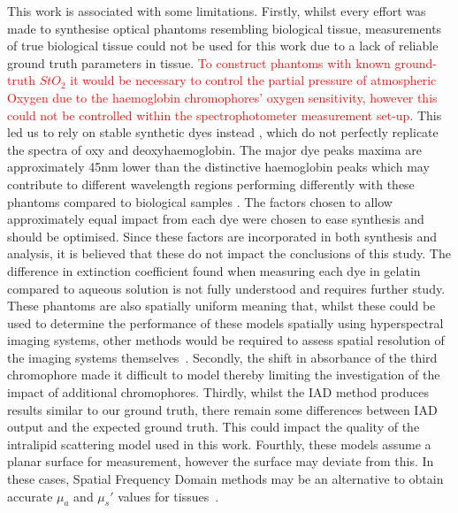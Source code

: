 This work is associated with some limitations.
Firstly, whilst every effort was made to synthesise optical phantoms resembling biological tissue, measurements of true biological tissue could not be used for this work due to a lack of reliable ground truth parameters in tissue. %
\textcolor{red}{To construct phantoms with known ground-truth $StO_2$ it would be necessary to control the partial pressure of atmospheric Oxygen due to the haemoglobin chromophores' oxygen sensitivity, however this could not be controlled within the spectrophotometer measurement set-up.} This led us to rely on stable synthetic dyes instead
, which do not perfectly replicate the spectra of oxy and deoxyhaemoglobin. The major dye peaks maxima are approximately 45nm lower than the distinctive haemoglobin peaks which may contribute to different wavelength regions performing differently with these phantoms compared to biological samples
. 
The factors chosen to allow approximately equal impact from each dye were chosen to ease synthesis and should be optimised. Since these factors are incorporated in both synthesis and analysis, it is believed that these do not impact the conclusions of this study.
The difference in extinction coefficient found when measuring each dye in gelatin compared to aqueous solution is not fully understood and requires further study.
These phantoms are also spatially uniform meaning that, whilst these could be used to determine the performance of these models spatially using hyperspectral imaging systems, other methods would be required to assess spatial resolution of the imaging systems themselves~\citep{EdmundOptics2023, Torkildsen2018}.
%
Secondly, the shift in absorbance of the third chromophore made it difficult to model thereby limiting the investigation of the impact of additional chromophores.
%
Thirdly, whilst the IAD method produces results similar to our ground truth, there remain some differences between IAD output and the expected ground truth.
This could impact the quality of the intralipid scattering model used in this work.
%
Fourthly, these models assume a planar surface for measurement, however the surface may deviate from this. In these cases, Spatial Frequency Domain methods may be an alternative to obtain accurate $\mu_a$ and $\mu_s'$ values for tissues~\citep{Gioux2019}. 
